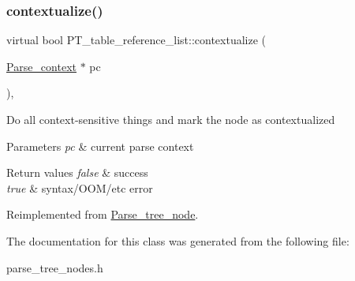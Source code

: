 \subsubsection{\texorpdfstring{contextualize()}{contextualize()}}
{\footnotesize\ttfamily virtual bool P\+T\+\_\+table\+\_\+reference\+\_\+list\+::contextualize (\begin{DoxyParamCaption}\item[{\mbox{\hyperlink{structParse__context}{Parse\+\_\+context}} $\ast$}]{pc }\end{DoxyParamCaption})\hspace{0.3cm}{\ttfamily [inline]}, {\ttfamily [virtual]}}

Do all context-\/sensitive things and mark the node as contextualized


\begin{DoxyParams}{Parameters}
{\em pc} & current parse context\\
\hline
\end{DoxyParams}

\begin{DoxyRetVals}{Return values}
{\em false} & success \\
\hline
{\em true} & syntax/\+O\+O\+M/etc error \\
\hline
\end{DoxyRetVals}


Reimplemented from \mbox{\hyperlink{classParse__tree__node_a22d93524a537d0df652d7efa144f23da}{Parse\+\_\+tree\+\_\+node}}.



The documentation for this class was generated from the following file\+:\begin{DoxyCompactItemize}
\item 
parse\+\_\+tree\+\_\+nodes.\+h\end{DoxyCompactItemize}
